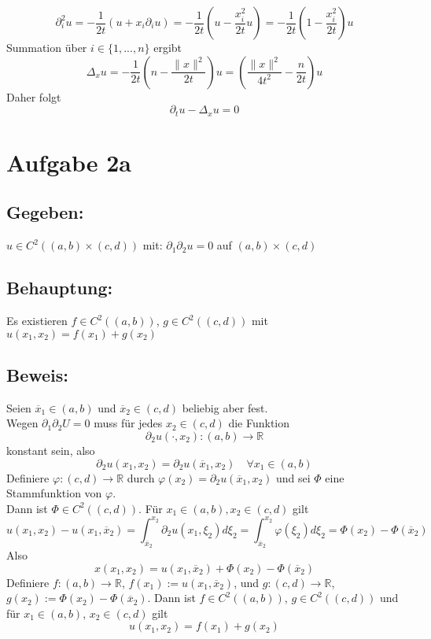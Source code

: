 \documentclass[a4paper, 12pt]{article} %
\begin{document}
\begin{flushleft}
        $$
        \partial^2_i u = - \frac{1}{2t} (u + x_i \partial_i u)
                       = - \frac{1}{2t} (u - \frac{x^2_i}{2t} u)
                       = - \frac{1}{2t} (1 - \frac{x^2_i}{2t}) u
        $$
        Summation über $i \in \{1,...,n\}$ ergibt
        $$
        \Delta_x u = - \frac{1}{2t} \left (n - \frac{\|x\|^2}{2t} \right ) u
                   = \left (\frac{\|x\|^2}{4t^2}- \frac{n}{2t} \right ) u
        $$
        Daher folgt
        $$
        \partial_t u - \Delta_x u = 0
        $$
        \QEDB

        
        \section*{Aufgabe 2a}

        \subsection*{Gegeben:}
        $u \in C^2((a,b) \times (c,d))$ mit: $\partial_1\partial_2u = 0$ auf $(a,b) \times (c,d)
        $

        \subsection*{Behauptung:}
        Es existieren $f \in C^2((a,b))$, $g \in C^2((c,d))$ mit $u(x_1,x_2) = f(x_1)+g(x_2)$
        
        \subsection*{Beweis:}
        Seien $\overline{x}_1 \in (a,b)$ und $\overline{x}_2 \in (c,d)$ beliebig aber fest. \\
        Wegen $\partial_1\partial_2U=0$ muss für jedes $x_2 \in (c,d)$ die Funktion
        $$
        \partial_2u(\cdot,x_2): (a,b) \rightarrow \mathbb{R}
        $$
        konstant sein, also
        $$
        \partial_2u(x_1,x_2) = \partial_2u(\overline{x}_1,x_2) \quad \forall x_1 \in (a,b)
        $$
        Definiere $\varphi:(c,d)\rightarrow \mathbb{R}$ durch $\varphi(x_2)=\partial_2u(\overline{x}_1,x_2)$ und sei $\Phi$ eine Stammfunktion von $\varphi$. \\
        Dann ist $\Phi \in C^2((c,d))$. Für $x_1 \in (a,b), x_2 \in (c,d)$ gilt
        $$
        u(x_1,x_2)-u(x_1,\overline{x}_2) 
            = \int_{\overline{x}_2}^{x_2} \partial_2 u(x_1,\xi_2)d\xi_2
            = \int_{\overline{x}_2}^{x_2} \varphi(\xi_2)d\xi_2
            = \Phi(x_2)-\Phi(\overline{x}_2)
        $$
        Also
        $$
        x(x_1,x_2) = u(x_1,\overline{x}_2) + \Phi(x_2) - \Phi(\overline{x}_2)
        $$
        Definiere $f:(a,b)\rightarrow\mathbb{R}$, $f(x_1) := u(x_1,\overline{x}_2)$,
        und $g:(c,d)\rightarrow\mathbb{R}$, $g(x_2) := \Phi(x_2) - \Phi(\overline{x}_2)$. 
        Dann ist $f \in C^2((a,b))$, $g \in C^2((c,d))$ und für $x_1 \in (a,b)$, $x_2 \in (c,d)$ gilt
        $$
        u(x_1,x_2)=f(x_1)+g(x_2)
        $$


\end{flushleft}
\end{document}
